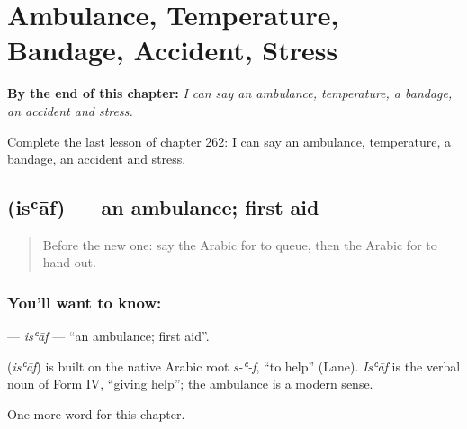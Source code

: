 
\chapter{Ambulance, Temperature, Bandage, Accident, Stress}
\label{ch:ar-ambulance-temperature-bandage-accident-stress}

\begin{chapteropening}
\textbf{By the end of this chapter:} \emph{I can say an ambulance, temperature, a bandage, an accident and stress.}

Complete the last lesson of chapter 262: I can say an ambulance, temperature, a bandage, an accident and stress.
\end{chapteropening}

\section[\texorpdfstring{\ar{إسعاف} (isʿāf)}{إسعاف (isʿāf)}]{ (isʿāf) — an ambulance; first aid}

\label{lesson:AR-C262-isaf}



\begin{quote}
Before the new one: say the Arabic for to queue, then the Arabic for to hand out.
\end{quote}

\subsection*{You'll want to know: }
\textbf{} — \emph{isʿāf} — \textquotedblleft{}an ambulance; first aid\textquotedblright{}.

\begin{cousinweb}
\textbf{} (\emph{isʿāf}) is built on the native Arabic root \emph{s-ʿ-f}, \textquotedblleft{}to help\textquotedblright{} (Lane). \emph{Isʿāf} is the verbal noun of Form IV, \textquotedblleft{}giving help\textquotedblright{}; the ambulance is a modern sense.
\end{cousinweb}

\begin{grammarlens}[title={What you've built}]
One more word for this chapter.
\end{grammarlens}

